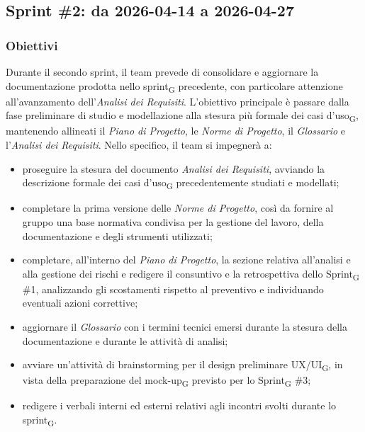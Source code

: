 ﻿\documentclass[a4paper, 10pt, colorlinks=true, linkcolor=black, urlcolor=blue, citecolor=blue, hidelinks]{article}
\begin{document}
\subsection{Sprint \#2: da 2026-04-14 a 2026-04-27}

\subsubsection{Obiettivi}
Durante il secondo sprint, il team prevede di consolidare e aggiornare la documentazione prodotta nello sprint\textsubscript{G} precedente, con particolare attenzione all'avanzamento dell'\textit{Analisi dei Requisiti}. L'obiettivo principale è passare dalla fase preliminare di studio e modellazione alla stesura più formale dei casi d'uso\textsubscript{G}, mantenendo allineati il \textit{Piano di Progetto}, le \textit{Norme di Progetto}, il \textit{Glossario} e l'\textit{Analisi dei Requisiti}.
Nello specifico, il team si impegnerà a:
\begin{itemize}
    \item proseguire la stesura del documento \textit{Analisi dei Requisiti}, avviando la descrizione formale dei casi d'uso\textsubscript{G} precedentemente studiati e modellati;

    \item completare la prima versione delle \textit{Norme di Progetto}, così da fornire al gruppo una base normativa condivisa per la gestione del lavoro, della documentazione e degli strumenti utilizzati;

    \item completare, all'interno del \textit{Piano di Progetto}, la sezione relativa all'analisi e alla gestione dei rischi e redigere il consuntivo e la retrospettiva dello Sprint\textsubscript{G} \#1, analizzando gli scostamenti rispetto al preventivo e individuando eventuali azioni correttive;

    \item aggiornare il \textit{Glossario} con i termini tecnici emersi durante la stesura della documentazione e durante le attività di analisi;

    \item avviare un'attività di brainstorming per il design preliminare UX/UI\textsubscript{G}, in vista della preparazione del mock-up\textsubscript{G} previsto per lo Sprint\textsubscript{G} \#3;

    \item redigere i verbali interni ed esterni relativi agli incontri svolti durante lo sprint\textsubscript{G}.
\end{itemize}
\end{document}
